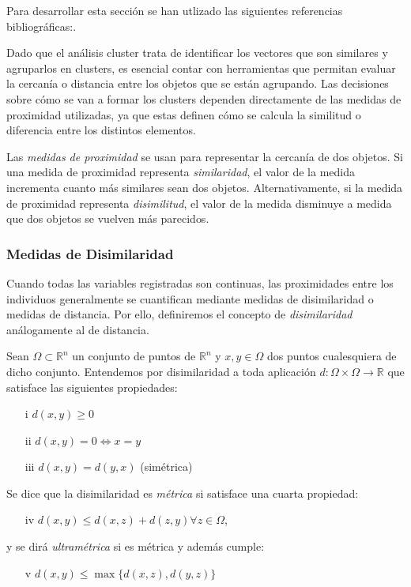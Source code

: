 Para desarrollar esta sección se han utlizado las siguientes referencias bibliográficas:\cite{clustering-2}\cite{Bib-5}. \newline%

Dado que el análisis cluster trata de identificar los vectores que son similares y agruparlos en clusters, es esencial contar con herramientas que permitan evaluar la cercanía o 
distancia entre los objetos que se están agrupando. Las decisiones sobre cómo se van a formar los clusters dependen directamente de las medidas de proximidad utilizadas, ya que estas 
definen cómo se calcula la similitud o diferencia entre los distintos elementos. \newline

Las \textit{medidas de proximidad} se usan para representar la cercanía de dos objetos. Si una medida de proximidad representa \textit{similaridad}, el valor de la medida incrementa 
cuanto más similares sean dos objetos. Alternativamente, si la medida de proximidad representa \textit{disimilitud}, el valor de la medida disminuye a medida que dos objetos se vuelven más 
parecidos.

\subsubsection{Medidas de Disimilaridad}

Cuando todas las variables registradas son continuas, las proximidades entre los individuos generalmente se cuantifican mediante medidas de disimilaridad o medidas de distancia. 
Por ello, definiremos el concepto de \textit{disimilaridad} análogamente al de distancia.

\begin{definicion}
    Sean $\Omega \subset \mathbb{R}^{n}$ un conjunto de puntos de $\mathbb{R}^{n}$ y $x,y \in \Omega$ dos puntos cualesquiera de dicho conjunto. Entendemos por disimilaridad a toda 
    aplicación $d: \Omega \times \Omega \longrightarrow \mathbb{R}$ que satisface las siguientes propiedades:

    \begin{itemize}
        \item[i] $d(x,y) \ge 0$
        \item[ii] $d(x,y)= 0 \Longleftrightarrow x = y$
        \item[iii] $d(x,y) = d(y,x)$ (simétrica)
    \end{itemize}
    Se dice que la disimilaridad es \textit{métrica} si satisface una cuarta propiedad:
    \begin{itemize}
        \item[iv] $d(x,y) \leq d(x,z) + d(z,y) \forall z \in \Omega$, 
    \end{itemize}
        
    y se dirá \textit{ultramétrica} si es métrica y además cumple:
        
    \begin{itemize}
        \item[v] $d(x,y) \leq \max\{d(x,z),d(y,z)\}$
    \end{itemize}
        
\end{definicion}


